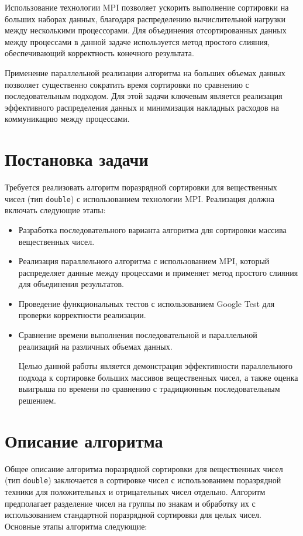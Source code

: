 \documentclass[12pt]{article}
\begin{document}
Использование технологии MPI позволяет ускорить выполнение сортировки на больших наборах данных, благодаря распределению вычислительной нагрузки между несколькими процессорами. Для объединения отсортированных данных между процессами в данной задаче используется метод простого слияния, обеспечивающий корректность конечного результата.

Применение параллельной реализации алгоритма на больших объемах данных позволяет существенно сократить время сортировки по сравнению с последовательным подходом. Для этой задачи ключевым является реализация эффективного распределения данных и минимизация накладных расходов на коммуникацию между процессами.

\section{Постановка задачи}

\hspace*{1.25em} Требуется реализовать алгоритм поразрядной сортировки для вещественных чисел (тип \texttt{double}) с использованием технологии MPI. Реализация должна включать следующие этапы:

\begin{itemize}
    \item Разработка последовательного варианта алгоритма для сортировки массива вещественных чисел.
    \item Реализация параллельного алгоритма с использованием MPI, который распределяет данные между процессами и применяет метод простого слияния для объединения результатов.
    \item Проведение функциональных тестов с использованием Google Test для проверки корректности реализации.
    \item Сравнение времени выполнения последовательной и параллельной реализаций на различных объемах данных.

Целью данной работы является демонстрация эффективности параллельного подхода к сортировке больших массивов вещественных чисел, а также оценка выигрыша по времени по сравнению с традиционным последовательным решением.
\end{itemize}
\section{Описание алгоритма}

\hspace*{1.25em}Общее описание алгоритма поразрядной сортировки для вещественных чисел (тип \texttt{double}) заключается в сортировке чисел с использованием поразрядной техники для положительных и отрицательных чисел отдельно. Алгоритм предполагает разделение чисел на группы по знакам и обработку их с использованием стандартной поразрядной сортировки для целых чисел. Основные этапы алгоритма следующие:
\end{document}
